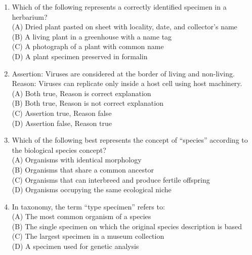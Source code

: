 \documentclass{article}
\begin{document}
\begin{enumerate}[label=Q\arabic*.]
\item Which of the following represents a correctly identified specimen in a herbarium?
\\(A) Dried plant pasted on sheet with locality, date, and collector's name
\\(B) A living plant in a greenhouse with a name tag
\\(C) A photograph of a plant with common name
\\(D) A plant specimen preserved in formalin

\item Assertion: Viruses are considered at the border of living and non-living.\\
Reason: Viruses can replicate only inside a host cell using host machinery.
\\(A) Both true, Reason is correct explanation
\\(B) Both true, Reason is not correct explanation
\\(C) Assertion true, Reason false
\\(D) Assertion false, Reason true

\item Which of the following best represents the concept of ``species'' according to the biological species concept?
\\(A) Organisms with identical morphology
\\(B) Organisms that share a common ancestor
\\(C) Organisms that can interbreed and produce fertile offspring
\\(D) Organisms occupying the same ecological niche

\item In taxonomy, the term ``type specimen'' refers to:
\\(A) The most common organism of a species
\\(B) The single specimen on which the original species description is based
\\(C) The largest specimen in a museum collection
\\(D) A specimen used for genetic analysis

\end{enumerate}
\end{document}

